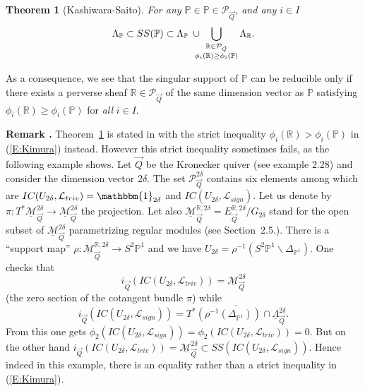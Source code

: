 \documentclass[a4paper,10pt]{amsart}
\def\PQ{\mathcal{P}_{\vec{Q}}}
\newtheorem{theo}{\bf{Theorem}}[section]
\numberwithin{equation}{section}
\begin{document}
\vspace{.1in}

\begin{theo}[Kashiwara-Saito]\label{T:KSSSup} For any $\mathbb{P} \in \mathbb{P} \in \PQ$, and any $i \in I$
\begin{equation}\label{E:Kimura}
\Lambda_{\mathbb{P}} \subset SS(\mathbb{P}) \subset \Lambda_{\mathbb{P}}\; \cup \hspace{-.1in}\bigcup_{\substack{\mathbb{R} \in \PQ\\ \phi_i(\mathbb{R}) \geq \phi_i(\mathbb{P})}} \Lambda_{\mathbb{R}}.
\end{equation}
\end{theo}

As a consequence, we see that the singular support of $\mathbb{P}$ can be reducible only if there exists a perverse sheaf $\mathbb{R} \in \PQ$ of the same dimension vector as $\mathbb{P}$ satisfying $\phi_i(\mathbb{R}) \geq \phi_i(\mathbb{P})$ for \textit{all} $i \in I$.

\vspace{.2in}

\addtocounter{theo}{1}
\noindent \textbf{Remark \thetheo .} Theorem~\ref{T:KSSSup} is stated in \cite{KS} with the strict inequality $\phi_i(\mathbb{R}) > \phi_i(\mathbb{P})$ in (\ref{E:Kimura}) instead. However this strict inequality sometimes fails, as the following example shows. Let $\vec{Q}$ be the Kronecker quiver (see example 2.28) and consider the dimension vector $2\delta$. The set $\mathcal{P}_{\vec{Q}}^{2\delta}$ contains six elements among which are $IC(U_{2\delta}, \mathcal{L}_{triv})=\mathbbm{1}_{2\delta}$ and $IC(U_{2\delta},\mathcal{L}_{sign})$. Let us denote by $\pi: T^*\underline{\mathcal{M}}_{\vec{Q}}^{2\delta} \to \underline{\mathcal{M}}_{\vec{Q}}^{2\delta}$ the projection. Let also $\underline{\mathcal{M}}^{\mathbb{R},2\delta}_{\vec{Q}}=E^{\mathbb{R},2\delta}_{\vec{Q}}/G_{2\delta}$ stand for the open subset of $\underline{\mathcal{M}}^{2\delta}_{\vec{Q}}$ parametrizing regular modules (see Section~2.5.). There is a ``support map'' $\rho: \underline{\mathcal{M}}^{\mathbb{R},2\delta}_{\vec{Q}} \to S^2\mathbb{P}^1$ and we have $U_{2\delta}=\rho^{-1}(S^2\mathbb{P}^1 \backslash \Delta_{\mathbb{P}^1})$. One checks that
$$i_{\vec{Q}}(IC(U_{2\delta},\mathcal{L}_{triv}))=\underline{\mathcal{M}}_{\vec{Q}}^{2\delta} $$
(the zero section of the cotangent bundle $\pi$) while 
$$i_{\vec{Q}}(IC(U_{2\delta},\mathcal{L}_{sign}))=\overline{T^*(\rho^{-1}(\Delta_{\mathbb{P}^1})) \cap \underline{\Lambda}^{2\delta}_{\vec{Q}}}.$$
From this one gets $\phi_2(IC(U_{2\delta},\mathcal{L}_{sign}))=\phi_2(IC(U_{2\delta},\mathcal{L}_{triv}))=0$. But on the other hand $i_{\vec{Q}}(IC(U_{2\delta},\mathcal{L}_{triv})) =\underline{\mathcal{M}}_{\vec{Q}}^{2\delta} \subset SS(IC(U_{2\delta},\mathcal{L}_{sign}))$. Hence indeed in this example, there is an equality rather than a strict inequality in (\ref{E:Kimura}).
\end{document}
